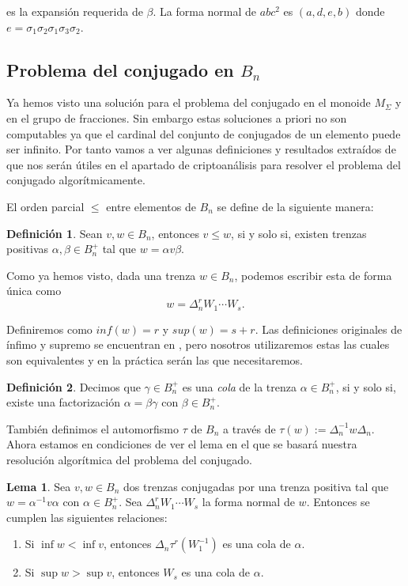 \documentclass[12pt]{article}
\theoremstyle{definition}
\newtheorem{defi}{Definición}[section]
\newtheorem{lema}{Lema}[section]
\begin{document}
es la expansión requerida de $\beta$. La forma normal de $abc^2$ es $(a,d,e,b)$ donde $e=\sigma_1\sigma_2\sigma_1\sigma_3\sigma_2$.

\subsection{Problema del conjugado en $B_n$}

Ya hemos visto una solución para el problema del conjugado en el monoide $M_\Sigma$ y en el grupo de fracciones. Sin embargo estas soluciones a priori no son computables ya que el cardinal del conjunto de conjugados de un elemento puede ser infinito. Por tanto vamos a ver algunas definiciones y resultados extraídos de \cite{Att} que nos serán útiles en el apartado de criptoanálisis para resolver el problema del conjugado algorítmicamente.

El orden parcial $\leq$ entre elementos de $B_n$ se define de la siguiente manera:

\begin{defi}
Sean $v,w\in B_n$, entonces $v\leq w$, si y solo si, existen trenzas positivas $\alpha,\beta\in B_n^{+}$ tal que $w = \alpha v\beta$.
\end{defi}

Como ya hemos visto, dada una trenza $w\in B_n$, podemos escribir esta de forma única como
$$w = \Delta_n^r W_1\cdots W_s.$$

Definiremos como $inf(w) = r$ y $sup(w)=s+r$. Las definiciones originales de ínfimo y supremo se encuentran en \cite{Alg}, pero nosotros utilizaremos estas las cuales son equivalentes y en la práctica serán las que necesitaremos.

\begin{defi}
Decimos que $\gamma\in B_n^+$ es una \textit{cola} de la trenza $\alpha\in B_n^+$, si y solo si, existe una factorización $\alpha = \beta\gamma$ con $\beta\in B_n^+$.
\end{defi}

También definimos el automorfismo $\tau$ de $B_n$ a través de $\tau(w):=\Delta_n^{-1}w\Delta_n$. Ahora estamos en condiciones de ver el lema en el que se basará nuestra resolución algorítmica del problema del conjugado.

\begin{lema}
Sea $v,w\in B_n$ dos trenzas conjugadas por una trenza positiva tal que $w = \alpha^{-1}v\alpha$ con $\alpha\in B_n^{+}$. Sea $\Delta^r_n W_1\cdots W_s$ la forma normal de $w$. Entonces se cumplen las siguientes relaciones:
\begin{enumerate}
\item Si $\inf w < \inf v$, entonces $\Delta_n\tau^r(W_1^{-1})$ es una cola de $\alpha$.
\item Si $\sup w > \sup v$, entonces $W_s$ es una cola de $\alpha$.
\end{enumerate}
\label{lema:criptoanalisis}
\end{lema}
\end{document}
